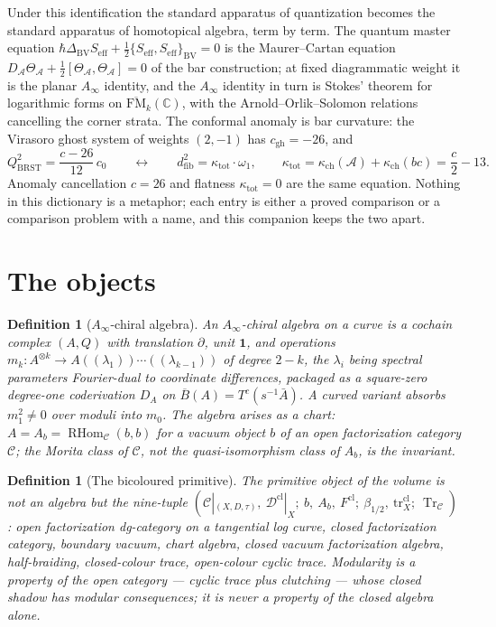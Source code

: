 \documentclass[11pt]{article}
\providecommand{\cA}{\mathcal{A}}
\providecommand{\cC}{\mathcal{C}}
\providecommand{\cD}{\mathcal{D}}
\providecommand{\bC}{\mathbb{C}}
\providecommand{\barB}{\overline{B}}
\providecommand{\FM}{\overline{\mathrm{FM}}}
\providecommand{\kch}{\kappa_{\mathrm{ch}}}
\providecommand{\Tr}{\operatorname{Tr}}
\newtheorem{definition}[theorem]{Definition}
\begin{document}
Under this identification the standard apparatus of quantization
becomes the standard apparatus of homotopical algebra, term by term.
The quantum master equation
$\hbar\Delta_{\mathrm{BV}}S_{\mathrm{eff}}
+\tfrac12\{S_{\mathrm{eff}},S_{\mathrm{eff}}\}_{\mathrm{BV}}=0$
is the Maurer--Cartan equation
$D_\cA\Theta_\cA+\tfrac12[\Theta_\cA,\Theta_\cA]=0$ of the bar
construction; at fixed diagrammatic weight it is the planar $A_\infty$
identity, and the $A_\infty$ identity in turn is Stokes' theorem for
logarithmic forms on $\FM_k(\bC)$, with the Arnold--Orlik--Solomon
relations cancelling the corner strata. The conformal anomaly is bar
curvature: the Virasoro ghost system of weights $(2,-1)$ has
$c_{\mathrm{gh}}=-26$, and
\[
Q_{\mathrm{BRST}}^2=\frac{c-26}{12}\,c_0
\qquad\longleftrightarrow\qquad
d_{\mathrm{fib}}^2=\kappa_{\mathrm{tot}}\cdot\omega_1,
\qquad
\kappa_{\mathrm{tot}}=\kch(\cA)+\kch(bc)=\frac{c}{2}-13 .
\]
Anomaly cancellation $c=26$ and flatness $\kappa_{\mathrm{tot}}=0$ are
the same equation. Nothing in this dictionary is a metaphor; each entry
is either a proved comparison or a comparison problem with a name, and
this companion keeps the two apart.

\section{The objects}\label{sec:objects}

\begin{definition}[$A_\infty$-chiral algebra]
An $A_\infty$-chiral algebra on a curve is a cochain complex $(A,Q)$
with translation $\partial$, unit $\mathbf 1$, and operations
$m_k\colon A^{\otimes k}\to A((\lambda_1))\cdots((\lambda_{k-1}))$ of
degree $2-k$, the $\lambda_i$ being spectral parameters Fourier-dual to
coordinate differences, packaged as a square-zero degree-one
coderivation $D_A$ on $\barB(A)=T^c(s^{-1}\bar A)$. A curved variant
absorbs $m_1^2\neq0$ over moduli into $m_0$. The algebra arises as a
chart: $A=A_b=\operatorname{RHom}_{\cC}(b,b)$ for a vacuum object $b$ of
an open factorization category $\cC$; the Morita class of $\cC$, not
the quasi-isomorphism class of $A_b$, is the invariant.
\end{definition}

\begin{definition}[The bicoloured primitive]
The primitive object of the volume is not an algebra but the nine-tuple
$(\cC|_{(X,D,\tau)},\ \cD^{\mathrm{cl}}|_X;\ b,\ A_b,\
F^{\mathrm{cl}};\ \beta_{1/2},\ \mathrm{tr}^{\mathrm{cl}}_X;\ \Tr_\cC)$:
open factorization dg-category on a tangential log curve, closed
factorization category, boundary vacuum, chart algebra, closed vacuum
factorization algebra, half-braiding, closed-colour trace, open-colour
cyclic trace. Modularity is a property of the open category --- cyclic
trace plus clutching --- whose closed shadow has modular consequences;
it is never a property of the closed algebra alone.
\end{definition}
\end{document}

